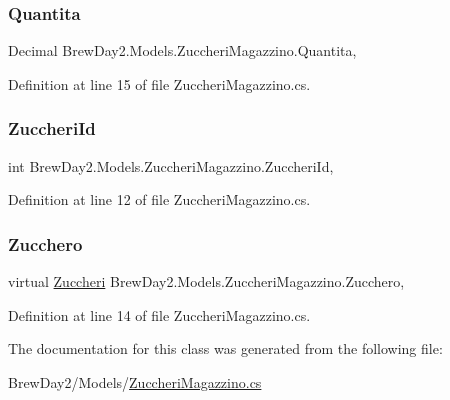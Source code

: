 \subsubsection{\texorpdfstring{Quantita}{Quantita}}
{\footnotesize\ttfamily Decimal Brew\+Day2.\+Models.\+Zuccheri\+Magazzino.\+Quantita\hspace{0.3cm}{\ttfamily [get]}, {\ttfamily [set]}}



Definition at line 15 of file Zuccheri\+Magazzino.\+cs.

\mbox{\label{class_brew_day2_1_1_models_1_1_zuccheri_magazzino_ad2624788b919fc78c3ea27876fb5b59e}} 
\subsubsection{\texorpdfstring{Zuccheri\+Id}{ZuccheriId}}
{\footnotesize\ttfamily int Brew\+Day2.\+Models.\+Zuccheri\+Magazzino.\+Zuccheri\+Id\hspace{0.3cm}{\ttfamily [get]}, {\ttfamily [set]}}



Definition at line 12 of file Zuccheri\+Magazzino.\+cs.

\mbox{\label{class_brew_day2_1_1_models_1_1_zuccheri_magazzino_a9a963de555ba0e8e6ed439c10994bd1b}} 
\subsubsection{\texorpdfstring{Zucchero}{Zucchero}}
{\footnotesize\ttfamily virtual \mbox{\hyperlink{class_brew_day2_1_1_models_1_1_zuccheri}{Zuccheri}} Brew\+Day2.\+Models.\+Zuccheri\+Magazzino.\+Zucchero\hspace{0.3cm}{\ttfamily [get]}, {\ttfamily [set]}}



Definition at line 14 of file Zuccheri\+Magazzino.\+cs.



The documentation for this class was generated from the following file\+:\begin{DoxyCompactItemize}
\item 
Brew\+Day2/\+Models/\mbox{\hyperlink{_zuccheri_magazzino_8cs}{Zuccheri\+Magazzino.\+cs}}\end{DoxyCompactItemize}

